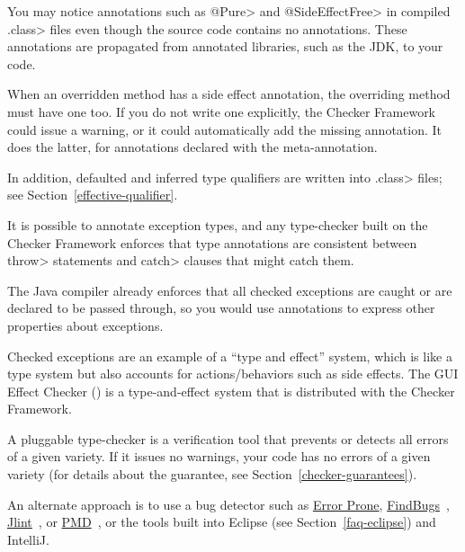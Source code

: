 
You may notice annotations such as \<@Pure> and \<@SideEffectFree> in
compiled \<.class> files even though the source code contains no
annotations.  These annotations are propagated from annotated libraries,
such as the JDK, to your code.

When an overridden method has a side effect annotation, the overriding
method must have one too.  If you do not write one explicitly, the Checker
Framework could issue a warning, or it could automatically add the missing
annotation.  It does the latter, for annotations declared with the
 meta-annotation.

In addition, defaulted and inferred type qualifiers are written into
\<.class> files; see Section~\ref{effective-qualifier}.



It is possible to annotate exception types, and any type-checker built on the
Checker Framework enforces that type annotations are consistent between
\<throw> statements and \<catch> clauses that might catch them.

The Java compiler already enforces that all checked exceptions are caught
or are declared to be passed through, so you would use annotations to
express other properties about exceptions.

Checked exceptions are an example of a ``type and effect'' system, which is
like a type system but also accounts for actions/behaviors such as side
effects.  The GUI Effect Checker () is a
type-and-effect system that is distributed with the Checker Framework.





A pluggable type-checker
is a verification tool that prevents or detects all errors of a given
variety.  If it issues no warnings, your code has no errors of a given
variety (for details about the guarantee, see
Section~\ref{checker-guarantees}).

An alternate approach is to use a bug detector such as
\href{https://errorprone.info//}{Error Prone},
\href{http://findbugs.sourceforge.net/}{FindBugs}~\cite{HovemeyerP2004,HovemeyerSP2005},
\href{http://jlint.sourceforge.net/}{Jlint}~\cite{Artho2001}, or
\href{https://pmd.github.io/}{PMD}~\cite{Copeland2005}, or the
tools built into Eclipse (see Section~\ref{faq-eclipse}) and IntelliJ\@.

